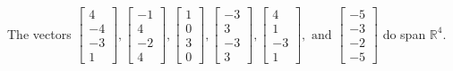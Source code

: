 \begin{exercise}
\begin{exerciseStatement}
  \end{exerciseStatement}
  \begin{exerciseAnswer}
   The vectors \(\left[\begin{array}{r}
4 \\
-4 \\
-3 \\
1
\end{array}\right] , \left[\begin{array}{r}
-1 \\
4 \\
-2 \\
4
\end{array}\right] , \left[\begin{array}{r}
1 \\
0 \\
3 \\
0
\end{array}\right] , \left[\begin{array}{r}
-3 \\
3 \\
-3 \\
3
\end{array}\right] , \left[\begin{array}{r}
4 \\
1 \\
-3 \\
1
\end{array}\right] , \text{ and } \left[\begin{array}{r}
-5 \\
-3 \\
-2 \\
-5
\end{array}\right]\) 
  	 do  
	span \(\mathbb{R}^4\).
  


  \end{exerciseAnswer}
\end{exercise}